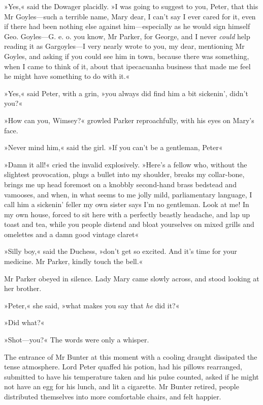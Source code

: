 »Yes,« said the Dowager placidly. »I was going to suggest to you, Peter, that this Mr Goyles\allowbreak---\allowbreak such a terrible name, Mary dear, I can't say I ever cared for it, even if there had been nothing else against him\allowbreak---\allowbreak especially as he would sign himself Geo. Goyles\allowbreak---\allowbreak G. e. o. you know, Mr Parker, for George, and I never \textit{could} help reading it as Gargoyles\allowbreak---\allowbreak I very nearly wrote to you, my dear, mentioning Mr Goyles, and asking if you could see him in town, because there was something, when I came to think of it, about that ipecacuanha business that made me feel he might have something to do with it.«

»Yes,« said Peter, with a grin, »you always did find him a bit sickenin', didn't you?«

»How can you, Wimsey?« growled Parker reproachfully, with his eyes on Mary's face.

»Never mind him,« said the girl. »If you can't be a gentleman, Peter\longdash«

»Damn it all!« cried the invalid explosively. »Here's a fellow who, without the slightest provocation, plugs a bullet into my shoulder, breaks my collar-bone, brings me up head foremost on a knobbly second-hand brass bedstead and vamooses, and when, in what seems to me jolly mild, parliamentary language, I call him a sickenin' feller my own sister says I'm no gentleman. Look at me! In my own house, forced to sit here with a perfectly beastly headache, and lap up toast and tea, while you people distend and bloat yourselves on mixed grills and omelettes and a damn good vintage claret\longdash«

»Silly boy,« said the Duchess, »don't get so excited. And it's time for your medicine. Mr Parker, kindly touch the bell.«

Mr Parker obeyed in silence. Lady Mary came slowly across, and stood looking at her brother.

»Peter,« she said, »what makes you say that \textit{he} did it?«

»Did what?«

»Shot\allowbreak---\allowbreak you?« The words were only a whisper.

The entrance of Mr Bunter at this moment with a cooling draught dissipated the tense atmosphere. Lord Peter quaffed his potion, had his pillows rearranged, submitted to have his temperature taken and his pulse counted, asked if he might not have an egg for his lunch, and lit a cigarette. Mr Bunter retired, people distributed themselves into more comfortable chairs, and felt happier.

